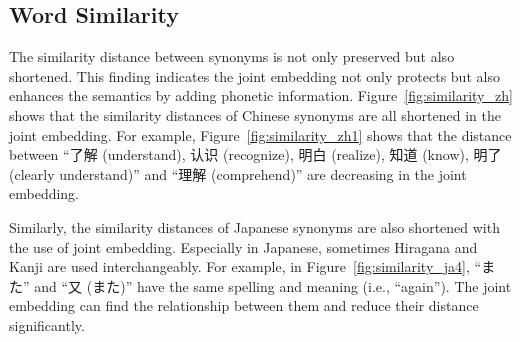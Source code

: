 \subsection{Word Similarity} \label{sec:analysis_similarity}
\begin{CJK}{UTF8}{gbsn}
    The similarity distance between synonyms is not only preserved but also shortened. This finding indicates the joint embedding not only protects but also enhances the semantics by adding phonetic information. Figure~\ref{fig:similarity_zh} shows that the similarity distances of Chinese synonyms are all shortened in the joint embedding. For example, Figure~\ref{fig:similarity_zh1} shows that the distance between ``了解 (understand), 认识 (recognize), 明白 (realize), 知道 (know), 明了 (clearly understand)'' and ``理解 (comprehend)'' are decreasing in the joint embedding.

    
    
    
\end{CJK}

\begin{CJK}{UTF8}{long}
    Similarly, the similarity distances of Japanese synonyms are also shortened with the use of joint embedding. Especially in Japanese, sometimes Hiragana and Kanji are used interchangeably. For example, in Figure~\ref{fig:similarity_ja4}, ``また'' and ``又 (また)'' have the same spelling and meaning (i.e., ``again''). The joint embedding can find the relationship between them and reduce their distance significantly.
\end{CJK}

